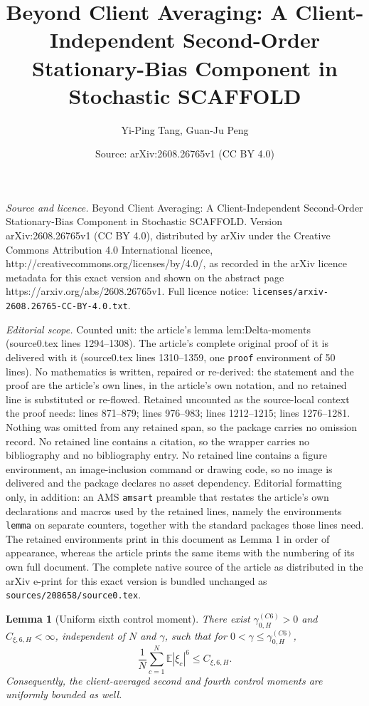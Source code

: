 \documentclass[10pt,a4paper]{amsart}
\title{Beyond Client Averaging: A Client-Independent Second-Order Stationary-Bias Component in Stochastic SCAFFOLD}
\author{Yi-Ping Tang, Guan-Ju Peng}
\date{Source: arXiv:2608.26765v1 (CC BY 4.0)}
\newtheorem{lemma}{Lemma}
\newcommand{\E}{\mathbb{E}}
\begin{document}
\maketitle

\noindent\emph{Source and licence.} Beyond Client Averaging: A Client-Independent Second-Order Stationary-Bias Component in Stochastic SCAFFOLD. Version arXiv:2608.26765v1 (CC BY 4.0), distributed by arXiv under the Creative Commons Attribution 4.0 International licence, http://creativecommons.org/licenses/by/4.0/, as recorded in the arXiv licence metadata for this exact version and shown on the abstract page https://arxiv.org/abs/2608.26765v1. Full licence notice: \texttt{licenses/arxiv-2608.26765-CC-BY-4.0.txt}.\par\smallskip

\noindent\textit{Editorial scope.} Counted unit: the article's lemma lem:Delta-moments (source0.tex lines 1294--1308). The article's complete original proof of it is delivered with it (source0.tex lines 1310--1359, one \texttt{proof} environment of 50 lines). No mathematics is written, repaired or re-derived: the statement and the proof are the article's own lines, in the article's own notation, and no retained line is substituted or re-flowed.  Retained uncounted as the source-local context the proof needs: lines 871--879; lines 976--983; lines 1212--1215; lines 1276--1281.  Nothing was omitted from any retained span, so the package carries no omission record.  No retained line contains a citation, so the wrapper carries no bibliography and no bibliography entry.  No retained line contains a figure environment, an image-inclusion command or drawing code, so no image is delivered and the package declares no asset dependency.  Editorial formatting only, in addition: an AMS \texttt{amsart} preamble that restates the article's own declarations and macros used by the retained lines, namely the environments \texttt{lemma} on separate counters, together with the standard packages those lines need.  The retained environments print in this document as Lemma 1 in order of appearance, whereas the article prints the same items with the numbering of its own full document.  The complete native source of the article as distributed in the arXiv e-print for this exact version is bundled unchanged as \texttt{sources/208658/source0.tex}.
\begin{lemma}[Uniform sixth control moment]
\label{lem:control-sixth}
There exist $\gamma_{0,H}^{(C6)}>0$ and $C_{\xi,6,H}<\infty$, independent of $N$ and $\gamma$, such that for $0<\gamma\le\gamma_{0,H}^{(C6)}$,
\begin{equation}
\label{eq:control-sixth}
  \frac1N\sum_{c=1}^N\E|\xi_c|^6\le C_{\xi,6,H}.
\end{equation}
Consequently, the client-averaged second and fourth control moments are uniformly bounded as well.
\end{lemma}
\end{document}
